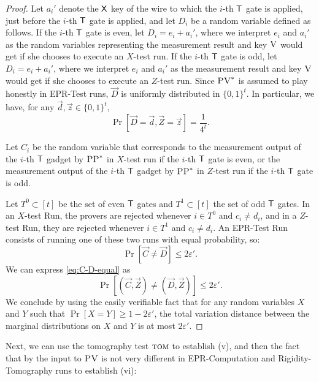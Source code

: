 \documentclass{toc}
\newcommand{\eps}{\varepsilon}
\newcommand{\tom}{\textsc{tom}}
\newcommand{\ver}{\textsc{V}}
\newcommand{\pv}{\textsc{PV}}
\newcommand{\pp}{\textsc{PP}}
\begin{document}
\begin{proof}
Let $a_i'$ denote the $\sf X$ key of the wire to which the $i$-th $\sf T$ gate is applied, just before the $i$-th $\sf T$ gate is applied, and let $D_i$ be a random variable defined as follows. If the $i$-th $\sf T$ gate is even, let $D_i=e_i+a_i'$, where we interpret $e_i$ and $a_i'$ as the random variables representing the measurement result and key $\ver$ would get if she chooses to execute an $X$-test run. If the $i$-th $\sf T$ gate is odd, let $D_i=e_i+a_i'$, where we interpret $e_i$ and $a_i'$ as the measurement result and key $\ver$ would get if she chooses to execute an $Z$-test run. Since $\pv^*$ is assumed to play honestly in EPR-Test runs, $\vec{D}$ is uniformly distributed in $\{0,1\}^t$. In particular, we have, for any $\vec{d},\vec{z}\in\{0,1\}^t$,
\begin{equation}
\Pr[\vec{D}=\vec{d},\vec{Z}=\vec{z}]=\frac{1}{4^t}.\label{eq:D-unif}
\end{equation}

Let $C_i$ be the random variable that corresponds to the measurement output of
  the $i$-th $\sf T$ gadget by $\pp^*$ in $X$-test run if the $i$-th $\sf T$
  gate is even, or the measurement output of the $i$-th $\sf T$ gadget 
  by $\pp^*$ in $Z$-test run if the $i$-th $\sf T$ gate is odd.

Let $T^0\subset[t]$ be the set of even $\sf T$ gates and $T^1\subset[t]$ the set of odd $\sf T$ gates. In an $X$-test Run, the provers are rejected whenever $i\in T^0$ and $c_i\neq d_i$, and in a $Z$-test Run, they are rejected whenever $i\in T^1$ and $c_i\neq d_i$. An EPR-Test Run consists of running one of these two runs with equal probability, so:
\begin{equation}
\Pr[\vec{C}\neq\vec{D}]  \leq  2\eps'.\label{eq:C-D-equal}
\end{equation}
We can express \eqref{eq:C-D-equal} as
\begin{equation*}
\Pr[(\vec{C},\vec{Z})\neq(\vec{D},\vec{Z})]  \leq  2\eps'.
\end{equation*}
We conclude by using the easily verifiable fact that for any random variables $X$ and $Y$ such that $\Pr[X= Y]\geq 1-2\eps'$, the total variation distance between the marginal distributions on $X$ and $Y$ is at most $2\eps'$. 
\end{proof}

Next, we can use the tomography test $\tom$ to establish (v), and then the fact that by  the input to $\pv$ is not very different in EPR-Computation and Rigidity-Tomography runs to establish (vi):
\end{document}
